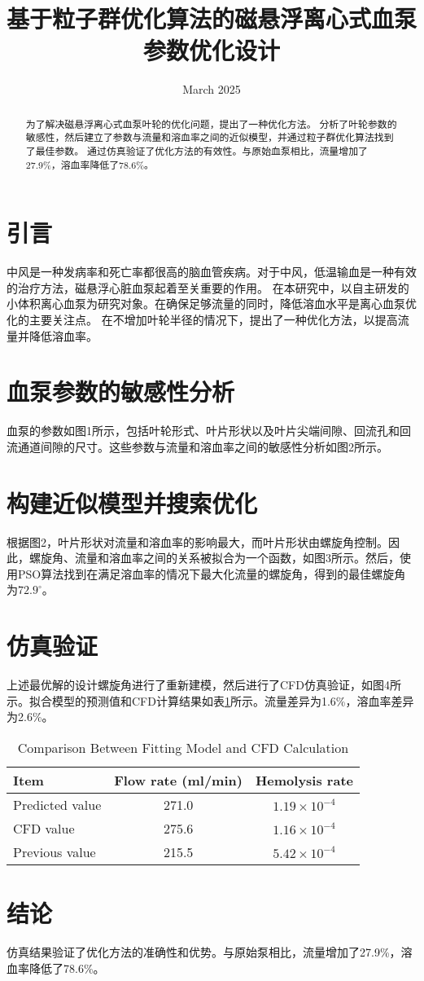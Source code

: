 \documentclass[12pt]{article}
\title{基于粒子群优化算法的磁悬浮离心式血泵参数优化设计}
\author{}
\date{March 2025}
\begin{document}
\maketitle

\begin{abstract}
为了解决磁悬浮离心式血泵叶轮的优化问题，提出了一种优化方法。
分析了叶轮参数的敏感性，然后建立了参数与流量和溶血率之间的近似模型，并通过粒子群优化算法找到了最佳参数。
通过仿真验证了优化方法的有效性。与原始血泵相比，流量增加了27.9\%，溶血率降低了78.6\%。
\end{abstract}

\section{引言}
中风是一种发病率和死亡率都很高的脑血管疾病。对于中风，低温输血是一种有效的治疗方法，磁悬浮心脏血泵起着至关重要的作用。
在本研究中，以自主研发的小体积离心血泵为研究对象。在确保足够流量的同时，降低溶血水平是离心血泵优化的主要关注点。
在不增加叶轮半径的情况下，提出了一种优化方法，以提高流量并降低溶血率。

\section{血泵参数的敏感性分析}
血泵的参数如图1所示，包括叶轮形式、叶片形状以及叶片尖端间隙、回流孔和回流通道间隙的尺寸。这些参数与流量和溶血率之间的敏感性分析如图2所示。

\section{构建近似模型并搜索优化}
根据图2，叶片形状对流量和溶血率的影响最大，而叶片形状由螺旋角控制。因此，螺旋角、流量和溶血率之间的关系被拟合为一个函数，如图3所示。然后，使用PSO算法找到在满足溶血率的情况下最大化流量的螺旋角，得到的最佳螺旋角为$72.9^\circ$。

\section{仿真验证}
上述最优解的设计螺旋角进行了重新建模，然后进行了CFD仿真验证，如图4所示。拟合模型的预测值和CFD计算结果如表\ref{tab:comparison}所示。流量差异为1.6\%，溶血率差异为2.6\%。

\begin{table}[h]
    \centering
    \caption{Comparison Between Fitting Model and CFD Calculation}
    \label{tab:comparison}
    \begin{tabular}{lcc}
        \toprule
        Item & Flow rate (ml/min) & Hemolysis rate \\
        \midrule
        Predicted value & 271.0 & $1.19 \times 10^{-4}$ \\
        CFD value & 275.6 & $1.16 \times 10^{-4}$ \\
        Previous value & 215.5 & $5.42 \times 10^{-4}$ \\
        \bottomrule
    \end{tabular}
\end{table}

\section{结论}
仿真结果验证了优化方法的准确性和优势。与原始泵相比，流量增加了27.9\%，溶血率降低了78.6\%。
\end{document}

